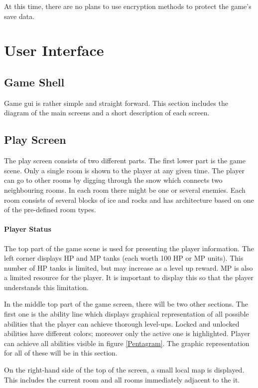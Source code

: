 \documentclass{article}
\begin{document}
At this time, there are no plans to use encryption methods to protect the game's save data.

\section{User Interface}

\subsection{Game Shell}

Game gui is rather simple and straight forward.  This section includes the diagram of the main screens and a short description of each screen.

\subsection{Play Screen}

The play screen consists of two different parts. The first lower part is the game scene.  Only a single room is shown to the player at any given time. The player can go to other rooms by digging through the snow which connects two neighbouring rooms.  In each room there might be one or several enemies.  Each room consists of several blocks of ice and rocks and has architecture based on one of the pre-defined room types.

\paragraph{Player Status}
The top part of the game scene is used for presenting the player information.  The left corner displays HP and MP tanks (each worth 100 HP or MP units).  This number of HP tanks is limited, but may increase as a level up reward.  MP is also a limited resource for the player.  It is important to display this so that the player understands this limitation.

In the middle top part of the game screen, there will be two other sections.  The first one is the ability line which displays graphical representation of all possible abilities that the player can achieve thorough level-ups.  Locked and unlocked abilities have different colors; moreover only the active one is highlighted. Player can achieve all abilities visible in figure \ref{Pentagram}. The graphic representation for all of these will be in this section.

On the right-hand side of the top of the screen, a small local map is displayed.  This includes the current room and all rooms immediately adjacent to the it.
\end{document}
